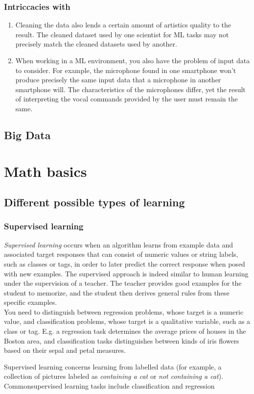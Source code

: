 \subsubsection{Intriccacies with}
\begin{enumerate}
	\item Cleaning the data also lends a certain amount of artistics quality to the result. The cleaned dataset used by one scientist for ML tasks may not precisely match the cleaned datasets used by another.
	\item When working in a ML environment, you also have the problem of input data to consider. For example, the microphone found in one smartphone won't produce precisely the same input data that a microphone in another smartphone will. The characteristics of the microphones differ, yet the result of interpreting the vocal commands provided by the user must remain the same.
\end{enumerate}

\subsection{Big Data}
\section{Math basics}
\subsection{Different possible types of learning}
\subsubsection{Supervised learning}
\emph{Supervised learning} occurs when an algorithm learns from example data and associated target responses that can consist of numeric values or string labels, such as classes or tags, in order to later predict the correct response when posed with new examples. The supervised approach is indeed similar to human learning under the supervision of a teacher. The teacher provides good examples for the student to memorize, and the student then derives general rules from these specific examples.\\
You need to distinguish between regression problems, whose target is a numeric value, and classification problems, whose target is a qualitative variable, such as a class or tag. E.g. a regression task determines the average prices of houses in the Boston area, and classification tasks distinguishes between kinds of iris flowers based on their sepal and petal measures. 
\begin{definition}
Supervised learning concerns learning from labelled data (for example, a collection of pictures labeled as \emph{containing a cat} or \emph{not containing a cat}). Commonsupervised learning tasks include classification and regression
\end{definition}
